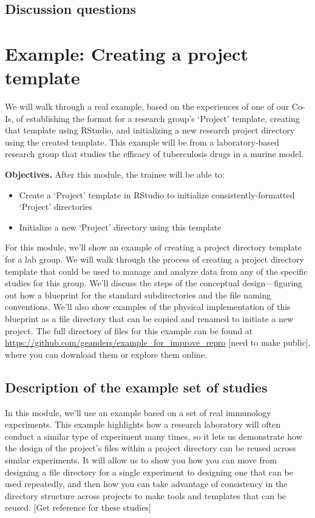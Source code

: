 \documentclass[]{tufte-book}
\providecommand{\tightlist}{%
  \setlength{\itemsep}{0pt}\setlength{\parskip}{0pt}}
\begin{document}
\subsection{Discussion questions}\label{discussion-questions}

\section{Example: Creating a project template}\label{module8}

We will walk through a real example, based on the experiences of one of our
Co-Is, of establishing the format for a research group's `Project' template,
creating that template using RStudio, and initializing a new research project
directory using the created template. This example will be from a
laboratory-based research group that studies the efficacy of tuberculosis drugs
in a murine model.

\textbf{Objectives.} After this module, the trainee will be able to:

\begin{itemize}
\tightlist
\item
  Create a `Project' template in RStudio to initialize consistently-formatted
  `Project' directories
\item
  Initialize a new `Project' directory using this template
\end{itemize}

For this module, we'll show an example of creating a project directory template
for a lab group. We will walk through the process of creating a project
directory template that could be used to manage and analyze data from any of the
specific studies for this group. We'll discuss the steps of the conceptual
design---figuring out how a blueprint for the standard subdirectories and the
file naming conventions. We'll also show examples of the physical implementation
of this blueprint as a file directory that can be copied and renamed to initiate
a new project. The full directory of files for this example can be found at
\url{https://github.com/geanders/example_for_improve_repro} {[}need to make public{]},
where you can download them or explore them online.

\subsection{Description of the example set of studies}\label{description-of-the-example-set-of-studies}

In this module, we'll use an example based on a set of real immunology
experiments. This example highlights how a research laboratory will often
conduct a similar type of experiment many times, so it lets us demonstrate how
the design of the project's files within a project directory can be reused
across similar experiments. It will allow us to show you how you can move from
designing a file directory for a single experiment to designing one that can be
used repeatedly, and then how you can take advantage of consistency in the
directory structure across projects to make tools and templates that can be
reused. {[}Get reference for these studies{]}
\end{document}
